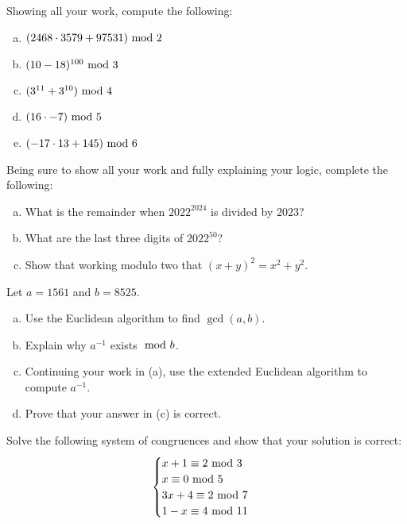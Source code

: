 \documentclass[12pt,letterpaper]{exam}
\begin{document}
\begin{questions}
\newpage
\question[10] Showing all your work, compute the following:
	\begin{enumerate}[(a)]
	\item $(2468 \cdot 3579 + 97531) \text{ mod } 2$
	\item $(10 - 18)^{100} \text{ mod } 3$
	\item $(3^{11} + 3^{10}) \text{ mod } 4$
	\item $(16 \cdot -7) \text{ mod } 5$
	\item $(-17 \cdot 13 + 145) \text{ mod } 6$
	\end{enumerate}



\newpage
\question[10] Being sure to show all your work and fully explaining your logic, complete the following:
	\begin{enumerate}[(a)]
	\item What is the remainder when $2022^{2024}$ is divided by $2023$?
	\item What are the last three digits of $2022^{50}$?
	\item Show that working modulo two that $(x + y)^2= x^2 + y^2$. 
	\end{enumerate}



\newpage
\question[10] Let $a= 1561$ and $b= 8525$.
	\begin{enumerate}[(a)]
	\item Use the Euclidean algorithm to find $\gcd(a, b)$. 
	\item Explain why $a^{-1}$ exists $\text{ mod } b$.
	\item Continuing your work in (a), use the extended Euclidean algorithm to compute $a^{-1}$.
	\item Prove that your answer in (c) is correct. 
	\end{enumerate}



\newpage
\question[10] Solve the following system of congruences and show that your solution is correct:
	\[
	\begin{cases}
	x + 1 \equiv 2 \text{ mod } 3 \\
	x \equiv 0 \text{ mod } 5 \\
	3x + 4 \equiv 2 \text{ mod } 7 \\
	1 - x \equiv 4 \text{ mod } 11
	\end{cases}
	\]


\end{questions}
\end{document}
